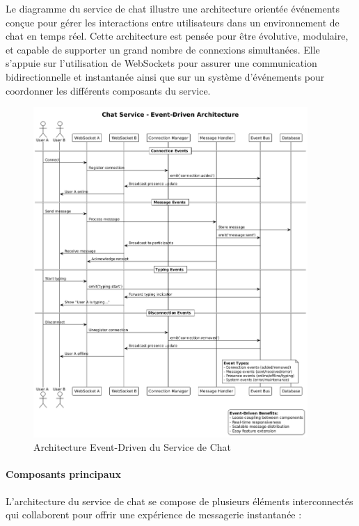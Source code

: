 \documentclass[12pt]{rapportPfe}
\begin{document}
Le diagramme du service de chat illustre une architecture orientée événements conçue pour gérer les interactions entre utilisateurs dans un environnement de chat en temps réel. Cette architecture est pensée pour être évolutive, modulaire, et capable de supporter un grand nombre de connexions simultanées. Elle s'appuie sur l'utilisation de WebSockets pour assurer une communication bidirectionnelle et instantanée ainsi que sur un système d'événements pour coordonner les différents composants du service.

\begin{figure}[htbp]
    \centering
    \includegraphics[width=0.93\textwidth]{diagrams/diagram4.png}
    \caption{Architecture Event-Driven du Service de Chat}
    \label{fig:chat-service-architecture}
\end{figure}

\paragraph{Composants principaux}

L'architecture du service de chat se compose de plusieurs éléments interconnectés qui collaborent pour offrir une expérience de messagerie instantanée :
\end{document}
